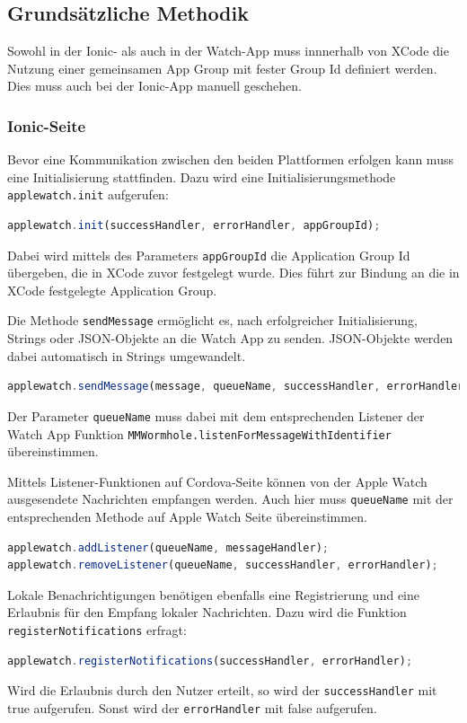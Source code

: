 \subsection{Grundsätzliche Methodik} 
%
Sowohl in der Ionic- als auch in der Watch-App muss innnerhalb von XCode die Nutzung einer gemeinsamen App Group mit fester Group Id definiert werden. Dies muss auch bei der Ionic-App manuell geschehen.
%
\subsubsection{Ionic-Seite}
%
Bevor eine Kommunikation zwischen den beiden Plattformen erfolgen kann muss eine Initialisierung stattfinden. Dazu wird eine Initialisierungsmethode \texttt{applewatch.init} aufgerufen:
\begin{lstlisting}[language=JavaScript]
applewatch.init(successHandler, errorHandler, appGroupId);
\end{lstlisting}
Dabei wird mittels des Parameters \texttt{appGroupId} die Application Group Id übergeben, die in XCode zuvor festgelegt wurde. Dies führt zur Bindung an die in XCode festgelegte Application Group.

Die Methode \texttt{sendMessage} ermöglicht es, nach erfolgreicher Initialisierung, Strings oder JSON-Objekte an die Watch App zu senden. JSON-Objekte werden dabei automatisch in Strings umgewandelt. 

\begin{lstlisting}[language=JavaScript]
applewatch.sendMessage(message, queueName, successHandler, errorHandler);
\end{lstlisting}
Der Parameter \texttt{queueName} muss dabei mit dem entsprechenden Listener der Watch App Funktion \texttt{MMWormhole.listenForMessageWithIdentifier} übereinstimmen. 

Mittels Listener-Funktionen auf Cordova-Seite können von der Apple Watch ausgesendete Nachrichten empfangen werden. Auch hier muss \texttt{queueName} mit der entsprechenden Methode auf Apple Watch Seite übereinstimmen.
\begin{lstlisting}[language=JavaScript]
applewatch.addListener(queueName, messageHandler);
applewatch.removeListener(queueName, successHandler, errorHandler);
\end{lstlisting}

Lokale Benachrichtigungen benötigen ebenfalls eine Registrierung und eine Erlaubnis für den Empfang lokaler Nachrichten. Dazu wird die Funktion \texttt{registerNotifications} erfragt:
\begin{lstlisting}[language=JavaScript]
applewatch.registerNotifications(successHandler, errorHandler);
\end{lstlisting}
Wird die Erlaubnis durch den Nutzer erteilt, so wird der \texttt{successHandler} mit true aufgerufen. Sonst wird der \texttt{errorHandler} mit false aufgerufen.

